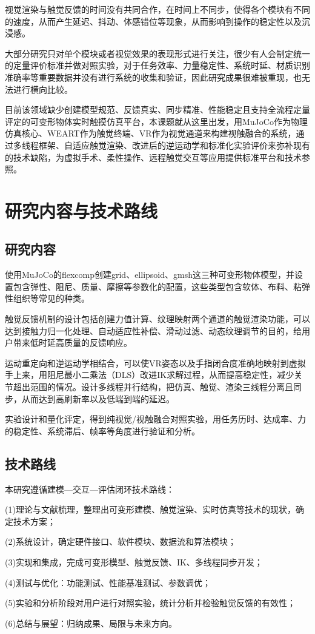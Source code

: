 视觉渲染与触觉反馈的时间没有共同合作，在时间上不同步，使得各个模块有不同的速度，从而产生延迟、抖动、体感错位等现象，从而影响到操作的稳定性以及沉浸感。

大部分研究只对单个模块或者视觉效果的表现形式进行关注，很少有人会制定统一的定量评价标准并做对照实验，对于任务效率、力量稳定性、系统时延、材质识别准确率等重要数据并没有进行系统的收集和验证，因此研究成果很难被重现，也无法进行横向比较。

目前该领域缺少创建模型规范、反馈真实、同步精准、性能稳定且支持全流程定量评定的可变形物体实时触摸仿真平台，本课题就从这里出发，用MuJoCo作为物理仿真核心、WEART作为触觉终端、VR作为视觉通道来构建视触融合的系统，通过多线程框架、自适应触觉渲染、改进后的逆运动学和标准化实验评价来弥补现有的技术缺陷，为虚拟手术、柔性操作、远程触觉交互等应用提供标准平台和技术参照。

\section{研究内容与技术路线}

\subsection{研究内容}

使用MuJoCo的flexcomp创建grid、ellipsoid、gmsh这三种可变形物体模型，并设置包含弹性、阻尼、质量、摩擦等参数化的配置，这些类型包含软体、布料、粘弹性组织等常见的种类。

触觉反馈机制的设计包括创建力值计算、纹理映射两个通道的触觉渲染功能，可以达到接触力归一化处理、自动适应性补偿、滑动过滤、动态纹理调节的目的，给用户带来低时延高质量的反馈响应。

运动重定向和逆运动学相结合，可以使VR姿态以及手指闭合度准确地映射到虚拟手上来，用阻尼最小二乘法（DLS）改进IK求解过程，从而提高稳定性，减少关节超出范围的情况。设计多线程并行结构，把仿真、触觉、渲染三线程分离且同步，从而达到高刷新率以及低端到端的延迟。

实验设计和量化评定，得到纯视觉/视触融合对照实验，用任务历时、达成率、力的稳定性、系统滞后、帧率等角度进行验证和分析。

\subsection{技术路线}

本研究遵循建模---交互---评估闭环技术路线：

(1)理论与文献梳理，整理出可变形建模、触觉渲染、实时仿真等技术的现状，确定技术方案；

(2)系统设计，确定硬件接口、软件模块、数据流和算法模块；

(3)实现和集成，完成可变形模型、触觉反馈、IK、多线程同步开发；

(4)测试与优化：功能测试、性能基准测试、参数调优；

(5)实验和分析阶段对用户进行对照实验，统计分析并检验触觉反馈的有效性；

(6)总结与展望：归纳成果、局限与未来方向。
